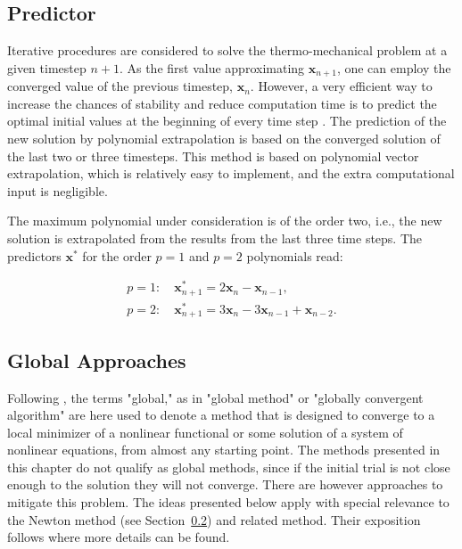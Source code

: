 \subsection{Predictor}

Iterative procedures are considered to solve the thermo-mechanical problem at a given timestep \(n+1\).
As the first value approximating \(\mathbf x_{n+1}\), one can employ the converged value of the previous timestep, \(\mathbf x_n\).
However, a very efficient way to increase the chances of stability and reduce computation time is to predict the optimal initial values at the beginning of every time step \citep{erbts_accelerated_2012, erbts_partitioned_2015, wendt_partitioned_2015}.
The prediction of the new solution by polynomial extrapolation is based on the converged solution of the last two or three timesteps.
This method is based on polynomial vector extrapolation, which is relatively easy to implement, and the extra computational input is negligible.

The maximum polynomial under consideration is of the order two, i.e., the new solution is extrapolated from the results from the last three time steps.
The predictors $\mathbf{x}^{*}$ for the order $p=1$ and $p=2$ polynomials read:
\begin{highlight}[innertopmargin=-5pt]
\begin{gather}
p=1:\quad \mathbf{x}_{n+1}^{*}=2 \mathbf{x}_{n}-\mathbf{x}_{n-1}, \\
p=2:\quad \mathbf{x}_{n+1}^{*}=3 \mathbf{x}_{n}-3 \mathbf{x}_{n-1}+\mathbf{x}_{n-2}.
\end{gather}
\end{highlight}

\subsection{Global Approaches}

Following \cite{dennis_numerical_1996}, the terms "global," as in "global method" or "globally convergent algorithm" are here used to denote a method that is designed to converge to a local minimizer of a nonlinear functional or some solution of a system of nonlinear equations, from almost any starting point.
The methods presented in this chapter do not qualify as global methods, since if the initial trial is not close enough to the solution they will not converge.
There are however approaches to mitigate this problem.
The ideas presented below apply with special relevance to the Newton method (see Section~\ref{}) and related method.
Their exposition follows \cite{dennis_numerical_1996} where more details can be found.

